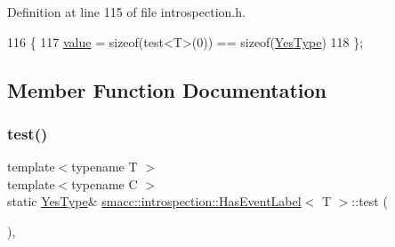 Definition at line 115 of file introspection.\+h.


\begin{DoxyCode}
116     \{
117         \hyperlink{classsmacc_1_1introspection_1_1HasEventLabel_a2de6073f80d42739c5ed78d301bd853ba3f57db3ac5b424aedec54eb89e48b732}{value} = \textcolor{keyword}{sizeof}(test<T>(0)) == \textcolor{keyword}{sizeof}(\hyperlink{classsmacc_1_1introspection_1_1HasEventLabel_a8d4b4c2ecb640812e11e8c1407636b6a}{YesType})
118     \};
\end{DoxyCode}


\subsection{Member Function Documentation}
\mbox{\label{classsmacc_1_1introspection_1_1HasEventLabel_ae3239e0c7cf38f2c4f3d3210d5e418a2}} 
\subsubsection{\texorpdfstring{test()}{test()}\hspace{0.1cm}{\footnotesize\ttfamily [1/2]}}
{\footnotesize\ttfamily template$<$typename T $>$ \\
template$<$typename C $>$ \\
static \hyperlink{classsmacc_1_1introspection_1_1HasEventLabel_a8d4b4c2ecb640812e11e8c1407636b6a}{Yes\+Type}\& \hyperlink{classsmacc_1_1introspection_1_1HasEventLabel}{smacc\+::introspection\+::\+Has\+Event\+Label}$<$ T $>$\+::test (\begin{DoxyParamCaption}\item[{decltype \&\+::get\+Event\+Label}]{ }\end{DoxyParamCaption})\hspace{0.3cm}{\ttfamily [static]}, {\ttfamily [private]}}

\mbox{\label{classsmacc_1_1introspection_1_1HasEventLabel_a8b29e9cf519f2adf6c0e8634cae63261}} 
